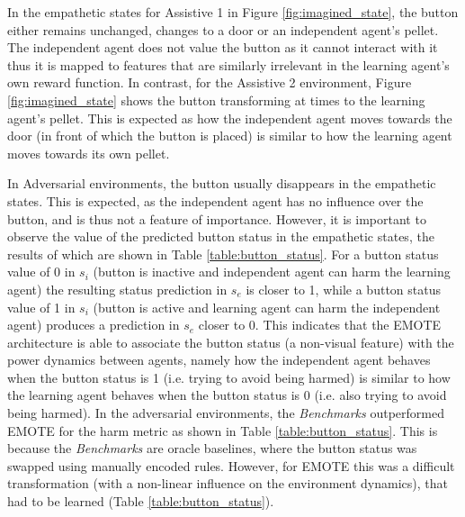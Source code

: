 In the empathetic states for Assistive 1 in Figure \ref{fig:imagined_state}, the button either remains unchanged, changes to a door or an independent agent's pellet. The independent agent does not value the button as it cannot interact with it thus it is mapped to features that are similarly irrelevant in the learning agent's own reward function.
In contrast, for the Assistive 2 environment, Figure \ref{fig:imagined_state} shows the button transforming at times to the learning agent's pellet. This is expected as how the independent agent moves towards the door (in front of which the button is placed) is similar to how the learning agent moves towards its own pellet. 

In Adversarial environments, the button usually disappears in the empathetic states. This is expected, as the independent agent has no influence over the button, and is thus not a feature of importance. However, it is important to observe the value of the predicted button status in the empathetic states, the results of which are shown in Table \ref{table:button_status}. For a button status value of 0 in $s_{i}$ (button is inactive and independent agent can harm the learning agent) the resulting status prediction in $s_{e}$ is closer to 1, while a button status value of 1 in $s_{i}$ (button is active and learning agent can harm the independent agent) produces a prediction in $s_{e}$ closer to 0. This indicates that the EMOTE architecture is able to associate the button status (a non-visual feature) with the power dynamics between agents, namely how the independent agent behaves when the button status is 1 (i.e. trying to avoid being harmed) is similar to how the learning agent behaves when the button status is 0 (i.e. also trying to avoid being harmed). In the adversarial environments, the \emph{Benchmarks} outperformed EMOTE for the harm metric as shown in Table \ref{table:button_status}. This is because the \emph{Benchmarks} are oracle baselines, where the button status was swapped using manually encoded rules. However, for EMOTE this was a difficult transformation (with a non-linear influence on the environment dynamics), that had to be learned (Table \ref{table:button_status}).

